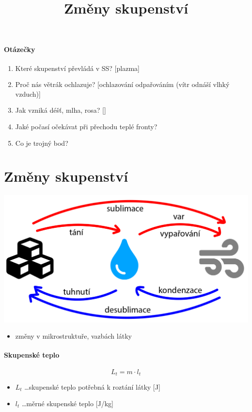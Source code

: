 \title{Změny skupenství}


\paragraph{Otázečky}
\begin{enumerate}
\item Které skupenství převládá v SS? [plazma]
\item Proč nás větrák ochlazuje? [ochlazování odpařováním (vítr odnáší vlhký vzduch)]
\item Jak vzniká déšť, mlha, rosa? []
\item Jaké počasí očekávat při přechodu teplé fronty?
\item Co je trojný bod?
\end{enumerate}

\section{Změny skupenství}
\includegraphics[width=1\textwidth]{pictures/premena_skupenstvi.png}
\begin{itemize}
\item změny v mikrostruktuře, vazbách látky
\end{itemize}

\paragraph{Skupenské teplo}
$$L_t = m \cdot l_t$$
\begin{itemize}
\item $L_t$ \ldots skupenské teplo potřebná k roztání látky [J]
\item $l_t$ \ldots měrné skupenské teplo [J/kg]
\end{itemize}

